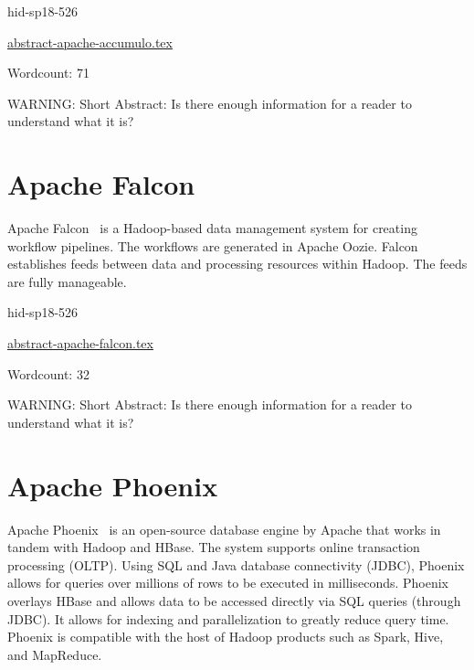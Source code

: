\begin{IU}

hid-sp18-526

\href{https://github.com/cloudmesh-community/hid-sp18-526/blob/master//technology/abstract-apache-accumulo.tex}{abstract-apache-accumulo.tex}

 

Wordcount: 71

WARNING: Short Abstract: Is there enough information for a reader to understand what it is?

\end{IU}

\section{Apache Falcon}

Apache Falcon~\cite{hid-sp18-www-526-apache-falcon} is
a Hadoop-based data management system for creating
workflow pipelines. The workflows are generated in Apache
Oozie. Falcon establishes feeds between data and processing
resources within Hadoop. The feeds are fully manageable.


\begin{IU}

hid-sp18-526

\href{https://github.com/cloudmesh-community/hid-sp18-526/blob/master//technology/abstract-apache-falcon.tex}{abstract-apache-falcon.tex}

 

Wordcount: 32

WARNING: Short Abstract: Is there enough information for a reader to understand what it is?

\end{IU}

\section{Apache Phoenix}

Apache Phoenix~\cite{hid-sp18-www-526-apache-phoenix} 
is an open-source database engine by Apache that works 
in tandem with Hadoop and HBase. The system supports online 
transaction processing (OLTP). Using SQL and Java database 
connectivity (JDBC), Phoenix allows for queries over millions of rows 
to be executed in milliseconds. Phoenix overlays HBase and allows 
data to be accessed directly via SQL queries (through JDBC). It allows
for indexing and parallelization to greatly reduce query time. Phoenix
is compatible with the host of Hadoop products such as Spark, Hive, 
and MapReduce.


